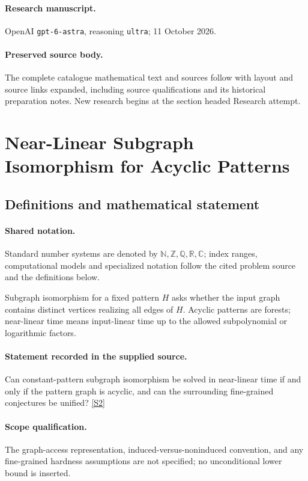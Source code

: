\documentclass[11pt]{article}
\begin{document}
\paragraph{Research manuscript.} OpenAI \texttt{gpt-6-astra}, reasoning \texttt{ultra}; 11 October 2026.
\paragraph{Preserved source body.} The complete catalogue mathematical text and sources follow with layout and source links expanded, including source qualifications and its historical preparation notes. New research begins at the section headed Research attempt.

\section{Near-Linear Subgraph Isomorphism for Acyclic Patterns}\label{statement}

\subsection{Definitions and mathematical statement}

\paragraph{Shared notation.}Standard number systems are denoted by $\mathbb N,\mathbb Z,\mathbb Q,\mathbb R,\mathbb C$; index ranges, computational models and specialized notation follow the cited problem source and the definitions below.


Subgraph isomorphism for a fixed pattern $H$ asks whether the input graph contains distinct vertices realizing all edges of $H$. Acyclic patterns are forests; near-linear time means input-linear time up to the allowed subpolynomial or logarithmic factors.
\paragraph{Statement recorded in the supplied source.}
Can constant-pattern subgraph isomorphism be solved in near-linear time if and only if the pattern graph is acyclic, and can the surrounding fine-grained conjectures be unified? \href{https://doi.org/10.4171/owr/2024/27}{[S2]}
\paragraph{Scope qualification.}
The graph-access representation, induced-versus-noninduced convention, and any fine-grained hardness assumptions are not specified; no unconditional lower bound is inserted.
\end{document}
